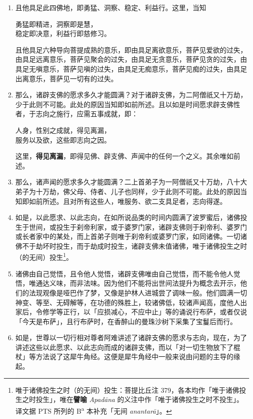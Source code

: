 \begin{enumerate}
\item 且他具足此四佛地，即勇猛、洞察、稳定、利益行。这里，当知\begin{quoting}勇猛即精进，洞察即是慧，\\稳定即决意，利益行即慈修习。\end{quoting}且他具足六种导向菩提成熟的意乐，即由具足离欲意乐，菩萨见爱欲的过失，由具足远离意乐，菩萨见聚会的过失，由具足无贪意乐，菩萨见贪的过失，由具足无嗔意乐，菩萨见嗔的过失，由具足无痴意乐，菩萨见痴的过失，由具足出离意乐，菩萨见一切有的过失。
\item 那么，诸辟支佛的愿求多久才能圆满？对于诸辟支佛，为二阿僧祇又十万劫，少于此则不可能。此处的原因当知即如前所述。且以如是时间愿求辟支佛性者，于志向之施行，应需五事成就，即：\begin{quoting}人身，性别之成就，得见离漏，\\服务以及欲，这些即志向之因。\end{quoting}这里，\textbf{得见离漏}，即得见佛、辟支佛、声闻中的任何一个之义。其余唯如前述。
\item 那么，诸声闻的愿求多久才能圆满？二上首弟子为一阿僧祇又十万劫，八十大弟子为十万劫，佛父母、侍者、儿子也同样，少于此则不可能。此处的原因当知即如前所述。且对所有这些人，唯服务、欲二支具足者，志向得遂。
\item 如是，以此愿求、以此志向，在如所说品类的时间内圆满了波罗蜜后，诸佛投生于世间，或投生于刹帝利家，或于婆罗门家，诸辟支佛则于刹帝利、婆罗门或长者家中的某处，而上首弟子则唯于刹帝利或婆罗门家，如同诸佛。一切诸佛不于劫坏时投生，而于劫成时投生，诸辟支佛未值诸佛，唯于诸佛投生之时（的无间）投生\footnote{唯于诸佛投生之时（的无间）投生：菩提比丘注 379，各本均作「唯于诸佛投生之时投生」，唯在\textbf{譬喻} \textit{Apadāna} 的义注中作「唯于诸佛投生之时不投生」。译文据 PTS 所列的 B\textsuperscript{a} 本补充「无间 \textit{anantarā}」。}。
\item 诸佛由自己觉悟，且令他人觉悟，诸辟支佛唯由自己觉悟，而不能令他人觉悟，唯通达义味，而非法味。因为他们不能将出世间法提升为概念去开示，他们的法现观像是哑巴作了梦，又像是护林人进城尝了调味一般。他们圆满一切神变、等至、无碍解等，在功德的殊胜上，较诸佛低，较诸声闻高，度他人出家后，令修学等正行，以「应损减心，不应中止」等的诵说行布萨，或者仅说「今天是布萨」，且行布萨时，在香醉山的曼珠沙树下采集了宝鬘后而行。
\item 如是，世尊以一切行相对尊者阿难讲述了诸辟支佛的愿求与志向，现在，为了讲述这些以此愿求、以此志向而成的诸辟支佛，而以「对一切生物放下了棍杖」等方法说了这犀牛角经。这便是犀牛角经中一般来说由问题的主导的缘起。\end{enumerate}

